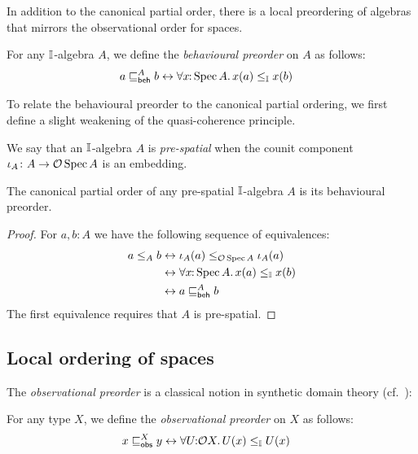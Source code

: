 In addition to the canonical partial order, there is a local preordering of algebras that mirrors the observational order for spaces.

\begin{definition}
  For any $\mathbb{I}$-algebra $A$, we define the \emph{behavioural preorder} on $A$ as follows:
  \begin{align*}
    a \behle[A] b &\eq \fa{x}{\spec{A}} x(a) \le_{\I} x(b)
  \end{align*}
\end{definition}


To relate the behavioural preorder to the canonical partial ordering, we first define a slight weakening of the quasi-coherence principle.

\begin{definition}
  We say that an $\mathbb{I}$-algebra $A$ is \emph{pre-spatial} when the counit component $\iota_A\colon A\to \mathcal{O}\operatorname{Spec}{A}$ is an embedding.
\end{definition}

\begin{proposition}\label{lem:canon-beh-coincide}
  The canonical partial order of any pre-spatial $\mathbb{I}$-algebra $A$ is its behavioural preorder.
\end{proposition}

\begin{proof}
  For $a,b:A$ we have the following sequence of equivalences:
  \begin{align*}
    a\le_A b 
    &\eq \iota_A(a) \le_{\opens\spec{A}} \iota_A(a)
    \\ 
    &\eq \fa{x}{\spec{A}} x(a) \le_{\I} x(b)
    \\ 
    &\eq a\behle[A]b
  \end{align*}
  The first equivalence requires that $A$ is pre-spatial.
\end{proof}


\subsection{Local ordering of spaces}

The \emph{observational preorder} is a classical notion in synthetic domain theory (cf.\ \citet{PhoaWesleyKym-Son1991DtiR,hyland1990first}):

\begin{definition}\label{defn:specialisation}
  For any type $X$, we define the \emph{observational preorder} on $X$ as follows:
  \begin{align*}
    x\obsle[X] y 
    &\eq \fa{U}{\opens{X}} U(x)\le_\I U(x)
  \end{align*}
\end{definition}

